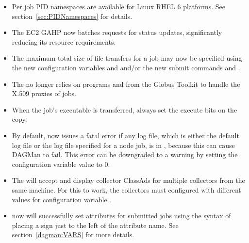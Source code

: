 \begin{itemize}

\item Per job PID namespaces are available for Linux RHEL 6 platforms.
See section~\ref{sec:PIDNamespaces} for details.

\item The EC2 GAHP now batches requests for status updates, significantly
reducing its resource requirements.

\item The maximum total size of file transfers for a job may now be
specified using the new configuration variables
 and  
and/or the new submit commands 
 and
.

\item The  no longer relies on programs
 and  from the Globus
Toolkit to handle the X.509 proxies of jobs.

\item When the job's executable is transferred, always set the execute
bits on the copy.

\item By default,  now issues a fatal error
if any log file, which is either
the default log file or the log file specified for a node job,
is in , because this can cause DAGMan to fail.
This error can be downgraded to a warning by setting the
configuration variable
 value to 0.

\item The  will accept and display collector ClassAds for
multiple collectors from the same machine. For this to work, the
collectors must configured with different values for configuration
variable .

\item {} now will successfully set attributes for submitted jobs
using the  syntax of placing a \Expr{+} sign just to the
left of the attribute name. 
See section~\ref{dagman:VARS} for more details.


\end{itemize}
